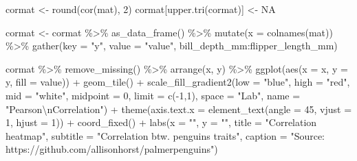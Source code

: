\documentclass[
]{book}
\newenvironment{Shaded}{\begin{snugshade}}{\end{snugshade}}
\newcommand{\AttributeTok}[1]{\textcolor[rgb]{0.77,0.63,0.00}{#1}}
\newcommand{\ConstantTok}[1]{\textcolor[rgb]{0.00,0.00,0.00}{#1}}
\newcommand{\DecValTok}[1]{\textcolor[rgb]{0.00,0.00,0.81}{#1}}
\newcommand{\FunctionTok}[1]{\textcolor[rgb]{0.00,0.00,0.00}{#1}}
\newcommand{\NormalTok}[1]{#1}
\newcommand{\OtherTok}[1]{\textcolor[rgb]{0.56,0.35,0.01}{#1}}
\newcommand{\SpecialCharTok}[1]{\textcolor[rgb]{0.00,0.00,0.00}{#1}}
\newcommand{\StringTok}[1]{\textcolor[rgb]{0.31,0.60,0.02}{#1}}
\begin{document}
\begin{Shaded}
\begin{Highlighting}[]
\NormalTok{cormat }\OtherTok{\textless{}{-}} \FunctionTok{round}\NormalTok{(}\FunctionTok{cor}\NormalTok{(mat), }\DecValTok{2}\NormalTok{)}
\NormalTok{cormat[}\FunctionTok{upper.tri}\NormalTok{(cormat)] }\OtherTok{\textless{}{-}} \ConstantTok{NA}

\NormalTok{cormat }\OtherTok{\textless{}{-}}\NormalTok{ cormat }\SpecialCharTok{\%\textgreater{}\%}
  \FunctionTok{as\_data\_frame}\NormalTok{() }\SpecialCharTok{\%\textgreater{}\%}
  \FunctionTok{mutate}\NormalTok{(}\AttributeTok{x =} \FunctionTok{colnames}\NormalTok{(mat)) }\SpecialCharTok{\%\textgreater{}\%}
  \FunctionTok{gather}\NormalTok{(}\AttributeTok{key =} \StringTok{"y"}\NormalTok{, }\AttributeTok{value =} \StringTok{"value"}\NormalTok{, bill\_depth\_mm}\SpecialCharTok{:}\NormalTok{flipper\_length\_mm)}

\NormalTok{cormat }\SpecialCharTok{\%\textgreater{}\%}
    \FunctionTok{remove\_missing}\NormalTok{() }\SpecialCharTok{\%\textgreater{}\%}
    \FunctionTok{arrange}\NormalTok{(x, y) }\SpecialCharTok{\%\textgreater{}\%}
    \FunctionTok{ggplot}\NormalTok{(}\FunctionTok{aes}\NormalTok{(}\AttributeTok{x =}\NormalTok{ x, }\AttributeTok{y =}\NormalTok{ y, }\AttributeTok{fill =}\NormalTok{ value)) }\SpecialCharTok{+} 
    \FunctionTok{geom\_tile}\NormalTok{() }\SpecialCharTok{+}
    \FunctionTok{scale\_fill\_gradient2}\NormalTok{(}\AttributeTok{low =} \StringTok{"blue"}\NormalTok{, }\AttributeTok{high =} \StringTok{"red"}\NormalTok{, }\AttributeTok{mid =} \StringTok{"white"}\NormalTok{, }
     \AttributeTok{midpoint =} \DecValTok{0}\NormalTok{, }\AttributeTok{limit =} \FunctionTok{c}\NormalTok{(}\SpecialCharTok{{-}}\DecValTok{1}\NormalTok{,}\DecValTok{1}\NormalTok{), }\AttributeTok{space =} \StringTok{"Lab"}\NormalTok{, }
     \AttributeTok{name =} \StringTok{"Pearson}\SpecialCharTok{\textbackslash{}n}\StringTok{Correlation"}\NormalTok{) }\SpecialCharTok{+}
    \FunctionTok{theme}\NormalTok{(}\AttributeTok{axis.text.x =} \FunctionTok{element\_text}\NormalTok{(}\AttributeTok{angle =} \DecValTok{45}\NormalTok{, }\AttributeTok{vjust =} \DecValTok{1}\NormalTok{, }\AttributeTok{hjust =} \DecValTok{1}\NormalTok{)) }\SpecialCharTok{+}
    \FunctionTok{coord\_fixed}\NormalTok{() }\SpecialCharTok{+}
      \FunctionTok{labs}\NormalTok{(}\AttributeTok{x =} \StringTok{""}\NormalTok{, }
           \AttributeTok{y =} \StringTok{""}\NormalTok{,}
          \AttributeTok{title =} \StringTok{"Correlation heatmap"}\NormalTok{, }
          \AttributeTok{subtitle =} \StringTok{"Correlation btw. penguins\textquotesingle{} traits"}\NormalTok{,}
          \AttributeTok{caption =} \StringTok{"Source: https://github.com/allisonhorst/palmerpenguins"}\NormalTok{)}
\end{Highlighting}
\end{Shaded}
\end{document}
